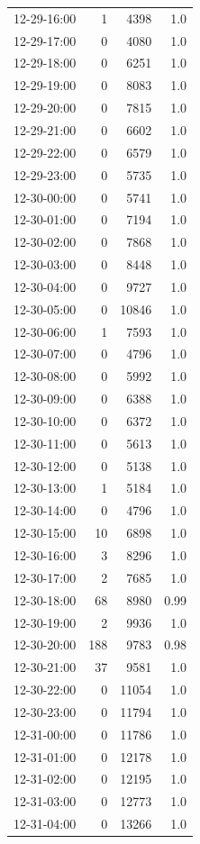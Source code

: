 \documentclass[11pt]{article}
\begin{document}
\begin{enumerate}
\begin{table}[htbp]
\begin{tabular}{rrrr}
12-29-16:00 & 1 & 4398 & 1.0\\
12-29-17:00 & 0 & 4080 & 1.0\\
12-29-18:00 & 0 & 6251 & 1.0\\
12-29-19:00 & 0 & 8083 & 1.0\\
12-29-20:00 & 0 & 7815 & 1.0\\
12-29-21:00 & 0 & 6602 & 1.0\\
12-29-22:00 & 0 & 6579 & 1.0\\
12-29-23:00 & 0 & 5735 & 1.0\\
12-30-00:00 & 0 & 5741 & 1.0\\
12-30-01:00 & 0 & 7194 & 1.0\\
12-30-02:00 & 0 & 7868 & 1.0\\
12-30-03:00 & 0 & 8448 & 1.0\\
12-30-04:00 & 0 & 9727 & 1.0\\
12-30-05:00 & 0 & 10846 & 1.0\\
12-30-06:00 & 1 & 7593 & 1.0\\
12-30-07:00 & 0 & 4796 & 1.0\\
12-30-08:00 & 0 & 5992 & 1.0\\
12-30-09:00 & 0 & 6388 & 1.0\\
12-30-10:00 & 0 & 6372 & 1.0\\
12-30-11:00 & 0 & 5613 & 1.0\\
12-30-12:00 & 0 & 5138 & 1.0\\
12-30-13:00 & 1 & 5184 & 1.0\\
12-30-14:00 & 0 & 4796 & 1.0\\
12-30-15:00 & 10 & 6898 & 1.0\\
12-30-16:00 & 3 & 8296 & 1.0\\
12-30-17:00 & 2 & 7685 & 1.0\\
12-30-18:00 & 68 & 8980 & 0.99\\
12-30-19:00 & 2 & 9936 & 1.0\\
12-30-20:00 & 188 & 9783 & 0.98\\
12-30-21:00 & 37 & 9581 & 1.0\\
12-30-22:00 & 0 & 11054 & 1.0\\
12-30-23:00 & 0 & 11794 & 1.0\\
12-31-00:00 & 0 & 11786 & 1.0\\
12-31-01:00 & 0 & 12178 & 1.0\\
12-31-02:00 & 0 & 12195 & 1.0\\
12-31-03:00 & 0 & 12773 & 1.0\\
12-31-04:00 & 0 & 13266 & 1.0\\

\end{tabular}
\end{table}
\end{enumerate}
\end{document}
